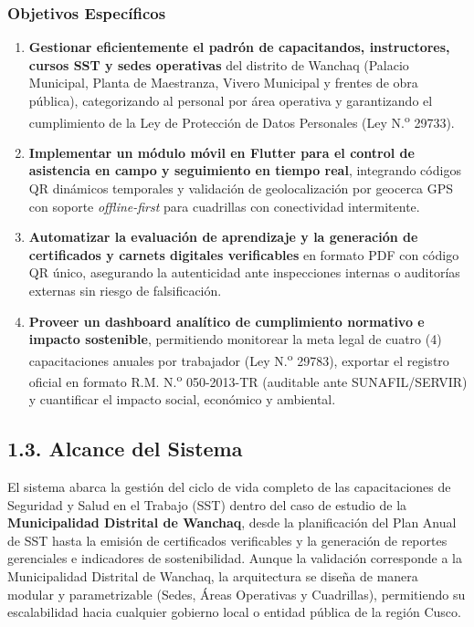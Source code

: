 \documentclass[11pt,a4paper]{article}
\begin{document}
\subsubsection*{Objetivos Específicos}
\begin{enumerate}[leftmargin=1.5em, itemsep=0.3em]
    \item \textbf{Gestionar eficientemente el padrón de capacitandos, instructores, cursos SST y sedes operativas} del distrito de Wanchaq (Palacio Municipal, Planta de Maestranza, Vivero Municipal y frentes de obra pública), categorizando al personal por área operativa y garantizando el cumplimiento de la Ley de Protección de Datos Personales (Ley N.\textsuperscript{o} 29733).
    \item \textbf{Implementar un módulo móvil en Flutter para el control de asistencia en campo y seguimiento en tiempo real}, integrando códigos QR dinámicos temporales y validación de geolocalización por geocerca GPS con soporte \textit{offline-first} para cuadrillas con conectividad intermitente.
    \item \textbf{Automatizar la evaluación de aprendizaje y la generación de certificados y carnets digitales verificables} en formato PDF con código QR único, asegurando la autenticidad ante inspecciones internas o auditorías externas sin riesgo de falsificación.
    \item \textbf{Proveer un dashboard analítico de cumplimiento normativo e impacto sostenible}, permitiendo monitorear la meta legal de cuatro (4) capacitaciones anuales por trabajador (Ley N.\textsuperscript{o} 29783), exportar el registro oficial en formato R.M. N.\textsuperscript{o} 050-2013-TR (auditable ante SUNAFIL/SERVIR) y cuantificar el impacto social, económico y ambiental.
\end{enumerate}

\subsection*{1.3. Alcance del Sistema}

El sistema abarca la gestión del ciclo de vida completo de las capacitaciones de Seguridad y Salud en el Trabajo (SST) dentro del caso de estudio de la \textbf{Municipalidad Distrital de Wanchaq}, desde la planificación del Plan Anual de SST hasta la emisión de certificados verificables y la generación de reportes gerenciales e indicadores de sostenibilidad. Aunque la validación corresponde a la Municipalidad Distrital de Wanchaq, la arquitectura se diseña de manera modular y parametrizable (Sedes, Áreas Operativas y Cuadrillas), permitiendo su escalabilidad hacia cualquier gobierno local o entidad pública de la región Cusco.
\end{document}
